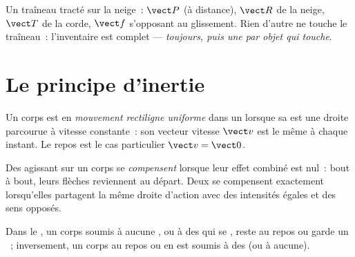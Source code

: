 \begin{example}\label{ex:g10:inertia:sled}
Un traîneau tracté sur la neige~:  $\vect P$ (à distance),
 $\vect R$ de la neige, 
$\vect T$ de la corde,  $\vect f$ s'opposant au
glissement. Rien d'autre ne touche le traîneau~: l'inventaire est
complet --- \emph{ toujours, puis une
 par objet qui touche}.
\end{example}

\section{Le principe d'inertie}

\begin{definition}\label{def:g10:inertia:uniform}
Un corps est en \emph{mouvement rectiligne uniforme} dans un  lorsque sa
 est une droite parcourue à vitesse
constante~: son vecteur vitesse $\vect v$ est le même à chaque
instant. Le repos est le cas particulier $\vect v = \vect 0$.
\end{definition}

\begin{definition}\label{def:g10:inertia:compensate}
Des  agissant sur un corps se
\emph{compensent} lorsque leur effet combiné
est nul~: bout à bout, leurs flèches reviennent au départ. Deux
 se compensent exactement lorsqu'elles partagent la même
droite d'action avec des intensités égales et des sens opposés.
\end{definition}

\begin{theorem}\label{thm:g10:inertia:principle}
Dans le , un corps soumis à aucune
, ou à des  qui se
, reste au repos ou garde un
~; inversement, un corps au
repos ou en  est soumis à des
 (ou à aucune).
\end{theorem}
\admitted

